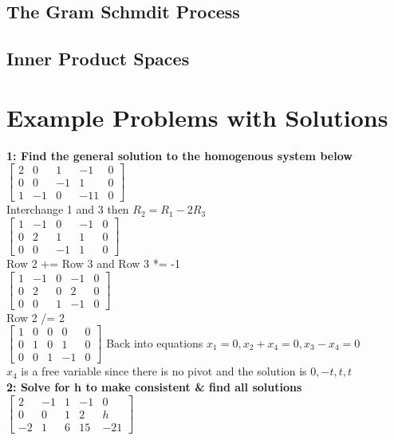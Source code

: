 \documentclass{article}
\begin{document}
\subsection{The Gram Schmdit Process}
\subsection{Inner Product Spaces}
\pagebreak
\section{Example Problems with Solutions}
\textbf{1: Find the general solution to the homogenous system below}\\[0.1in]
$\left[\begin{array}{cccc|c}
2 & 0 & 1 & -1 & 0 \\
0 & 0 & -1 & 1 & 0 \\
1 & -1 & 0 & -11 & 0
\end{array}\right]$
\\[0.05in]Interchange 1 and 3 then $R_2 = R_1-2R_3$\\[0.05in]
$\left[\begin{array}{cccc|c}
1 & -1 & 0 & -1 & 0 \\
0 & 2 & 1 & 1 & 0 \\
0 & 0 & -1 & 1 & 0
\end{array}\right]$
\\[0.05in]Row 2 += Row 3 and Row 3 *= -1\\[0.05in]
$\left[\begin{array}{cccc|c}
1 & -1 & 0 & -1 & 0 \\
0 & 2 & 0 & 2 & 0 \\
0 & 0 & 1 & -1 & 0
\end{array}\right]$
\\[0.05in]Row 2 /= 2\\[0.05in]
$\left[\begin{array}{cccc|c}
1 & 0 & 0 & 0 & 0 \\
0 & 1 & 0 & 1 & 0 \\
0 & 0 & 1 & -1 & 0
\end{array}\right]$
Back into equations $x_1=0, x_2+x_4=0, x_3-x_4=0$ \\[0.05in]$x_4$ is a free variable since there is no pivot and the solution is $\boxed{0, -t, t, t}$\\
\textbf{2: Solve for h to make consistent \& find all solutions}\\[0.05in]
$\left[\begin{array}{cccc|c}
2 & -1 & 1 & -1 & 0 \\
0 & 0 & 1 & 2 & h \\
-2 & 1 & 6 & 15 & -21
\end{array}\right]$
\end{document}
